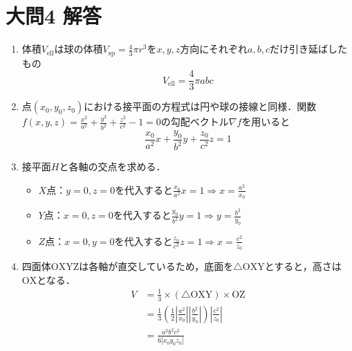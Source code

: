 \documentclass[dvipdfmx]{jsreport}
\begin{document}
\section{大問4 解答}
\begin{souanswer} %
\begin{enumerate}
	\item 体積$V_\mathrm{ell}$は球の体積$V_\mathrm{sp}= \frac{4}{3}\pi r^3$を$x, y, z$方向にそれぞれ$a, b, c$だけ引き延ばしたもの
\begin{equation*}
	V_\mathrm{ell}= \frac{4}{3}\pi abc
\end{equation*}
	\item 点$(x_0, y_0, z_0)$における接平面の方程式は円や球の接線と同様．関数$f(x, y, z)= \frac{x^2}{a^2}+ \frac{y^2}{b^2}+ \frac{z^2}{c^2}-1= 0$の勾配ベクトル$\nabla f$を用いると
\begin{equation*}
	\frac{x_0}{a^2}x+ \frac{y_0}{b^2}y+ \frac{z_0}{c^2}z= 1
\end{equation*}
	\item 接平面$H$と各軸の交点を求める．
\begin{itemize}
	\item $X$点：$y= 0, z= 0$を代入すると$\frac{x_0}{a^2}x= 1\Rightarrow x= \frac{a^2}{x_0}$
	\item $Y$点：$x= 0, z= 0$を代入すると$\frac{y_0}{b^2}y= 1\Rightarrow y= \frac{b^2}{y_0}$
	\item $Z$点：$x= 0, y= 0$を代入すると$\frac{z_0}{c^2}z= 1\Rightarrow x= \frac{c^2}{z_0}$
\end{itemize}
	\item 四面体$\mathrm{OXYZ}$は各軸が直交しているため，底面を$\triangle\mathrm{OXY}$とすると，高さは$\mathrm{OX}$となる．
\begin{align*}
	V
	&= \frac{1}{3}\times (\triangle\mathrm{OXY})\times \mathrm{OZ}\\
	&= \frac{1}{3}\left(\frac{1}{2}\left|\frac{a^2}{x_0}\right|\left|\frac{b^2}{y_0}\right|\right)\left|\frac{c^2}{z_0}\right|\\
	&= \frac{a^2b^2c^2}{6|x_0y_0z_0|}
\end{align*}


\end{enumerate}
\end{souanswer}
\end{document}

